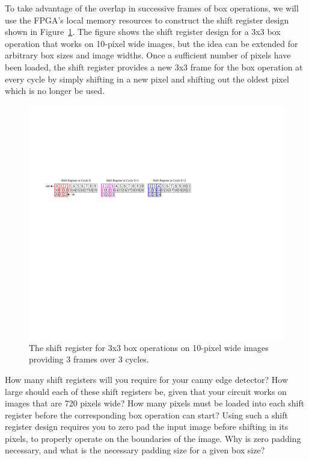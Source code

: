 \documentclass[epsfig,10pt,fullpage]{article}
\begin{document}
To take advantage of the overlap in successive frames of box operations, we will use the FPGA's local memory resources to construct 
the shift register design shown in Figure~\ref{fig:shift_register}. The figure shows the shift register design for a 3x3 box operation that
works on 10-pixel wide images, but the idea can be extended for arbitrary box sizes and image widths.
Once a sufficient number of pixels have been loaded, the shift register provides a new 3x3 frame for the box operation at every cycle by simply
shifting in a new pixel and shifting out the oldest pixel which is no longer be used.

\begin{figure}[H]
   \begin{center}
       \includegraphics[scale = 0.85]{figures/fig_shift_register}
   \end{center}
   \caption{The shift register for 3x3 box operations on 10-pixel wide images providing 3 frames over 3 cycles.}
	\label{fig:shift_register}
\end{figure}

How many shift registers will you require for your canny edge detector? How large should each of these shift registers be, given that
your circuit works on images that are 720 pixels wide? How many pixels must be loaded into each shift register before the corresponding box operation
can start? Using such a shift register design requires you to zero pad the input image before 
shifting in its pixels, to properly operate on the boundaries of the image. 
Why is zero padding necessary, and what is the necessary padding size for a given box size?
\end{document}
